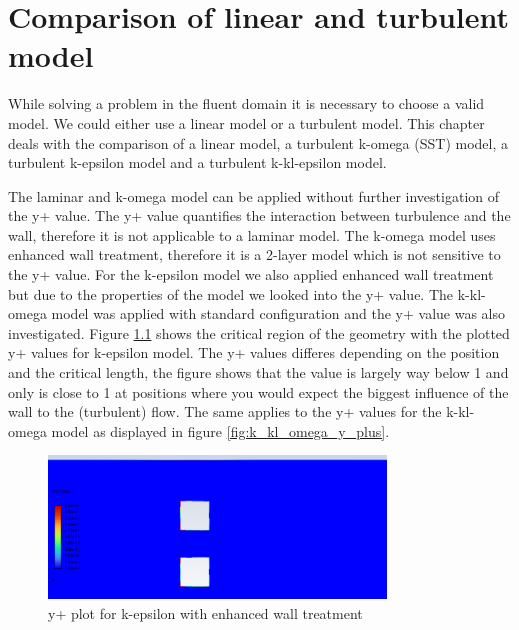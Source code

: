\chapter{Comparison of linear and turbulent model}
\label{chapter:solver_comp}

While solving a problem in the fluent domain it is necessary to choose a valid model. We could either use a linear model or a turbulent model.
This chapter deals with the comparison of a linear model, a turbulent k-omega (SST) model, a turbulent k-epsilon model and a turbulent k-kl-epsilon model.


The laminar and k-omega model can be applied without further investigation of the y+ value. The y+ value quantifies the interaction between turbulence and the wall, therefore it is not applicable to a laminar model. The k-omega model uses enhanced wall treatment, therefore it is a 2-layer model which is not sensitive to the y+ value.
For the k-epsilon model we also applied enhanced wall treatment but due to the properties of the model we looked into the y+ value. The k-kl-omega model was applied with standard configuration and the y+ value was also investigated. Figure \ref{fig:k_epsilon_enhanced_y_plus} shows the critical region of the geometry with the plotted y+ values for k-epsilon model. The y+ values differes depending on the position and the critical length, the figure shows that the value is largely way below 1 and only is close to 1 at positions where you would expect the biggest influence of the wall to the (turbulent) flow.
The same applies to the y+ values for the k-kl-omega model as displayed in figure \ref{fig:k_kl_omega_y_plus}.

\begin{figure}[htbp]   
    \centering
    \includegraphics[width=0.8\textwidth]{img/y_plus_k_epsilon_enhanced_wt.png}
    \caption{y+ plot for k-epsilon with enhanced wall treatment}
    \label{fig:k_epsilon_enhanced_y_plus}
\end{figure}

